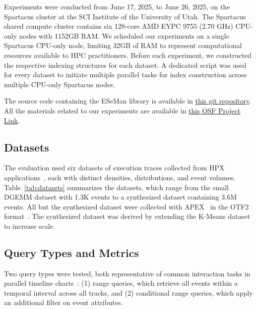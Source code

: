 \begin{refsection}
Experiments were conducted from June 17, 2025, to June 26, 2025, on the Spartacus cluster at the SCI Institute of the University of Utah. The Spartacus shared compute cluster contains six 128-core AMD EYPC 9755 (2.70 GHz) CPU-only nodes with 1152GB RAM. We scheduled our experiments on a single Spartacus CPU-only node, limiting 32GB of RAM to represent computational resources available to HPC practitioners. Before each experiment, we constructed the respective indexing structures for each dataset. A dedicated script was used for every dataset to initiate multiple parallel tasks for index construction across multiple CPU-only Spartacus nodes.

The source code containing the ESeMan library is available in \href{https://github.com/sayefsakin/eseman}{this git repository}. All the materials related to our experiments are available in \href{https://osf.io/vdcwx/?view_only=99748e7f1ac14886814ffb5404e82c60}{this OSF Project Link}.


\subsection{Datasets}
The evaluation used six datasets of execution traces collected from HPX applications~\cite{Kaiser2020HPX}, each with distinct densities, distributions, and event volumes. Table~\ref{tab:datasets} summarizes the datasets, which range from the small DGEMM dataset with 1.3K events to a synthesized dataset containing 3.6M events. All but the synthesized dataset were collected with APEX~\cite{diehl2022distributed} in the OTF2 format~\cite{eschweiler2012open}. The synthesized dataset was derived by extending the K-Means dataset to increase scale.

\subsection{Query Types and Metrics}
Two query types were tested, both representative of common interaction tasks in parallel timeline charts~\cite{sakin2024gantttaxonomy}: (1) range queries, which retrieve all events within a temporal interval across all tracks, and (2) conditional range queries, which apply an additional filter on event attributes.  


\end{refsection}
